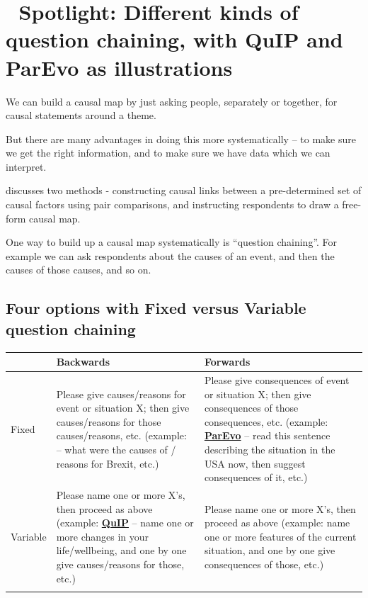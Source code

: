 \documentclass[
]{book}
\begin{document}
\hypertarget{spotlight-different-kinds-of-question-chaining-with-quip-and-parevo-as-illustrations}{%
\chapter{🧠 Spotlight: Different kinds of question chaining, with QuIP and ParEvo as illustrations}\label{spotlight-different-kinds-of-question-chaining-with-quip-and-parevo-as-illustrations}}

We can build a causal map by just asking people, separately or together, for causal statements around a theme.

But there are many advantages in doing this more systematically -- to make sure we get the right information, and to make sure we have data which we can interpret.

discusses two methods - constructing causal links between a pre-determined set of causal factors using pair comparisons, and instructing respondents to draw a free-form causal map.

One way to build up a causal map systematically is ``question chaining''. For example we can ask respondents about the causes of an event, and then the causes of those causes, and so on.

\hypertarget{four-options-with-fixed-versus-variable-question-chaining}{%
\section{Four options with Fixed versus Variable question chaining}\label{four-options-with-fixed-versus-variable-question-chaining}}

\begin{longtable}[]{@{}
  >{\raggedright\arraybackslash}p{}
  >{\raggedright\arraybackslash}p{}
  >{\raggedright\arraybackslash}p{}@{}}
\toprule
& Backwards & Forwards \\
\midrule
\endhead
Fixed & Please give causes/reasons for event or situation X; then give causes/reasons for those causes/reasons, etc. (example: -- what were the causes of / reasons for Brexit, etc.) & Please give consequences of event or situation X; then give consequences of those consequences, etc. (example: \href{http://parevo.org}{\textbf{ParEvo}} -- read this sentence describing the situation in the USA now, then suggest consequences of it, etc.) \\
Variable & Please name one or more X's, then proceed as above (example: \href{https://bathsdr.org/about-the-quip/}{\textbf{QuIP}} -- name one or more changes in your life/wellbeing, and one by one give causes/reasons for those, etc.) & Please name one or more X's, then proceed as above (example: name one or more features of the current situation, and one by one give consequences of those, etc.) \\
& & \\
\bottomrule
\end{longtable}
\end{document}

